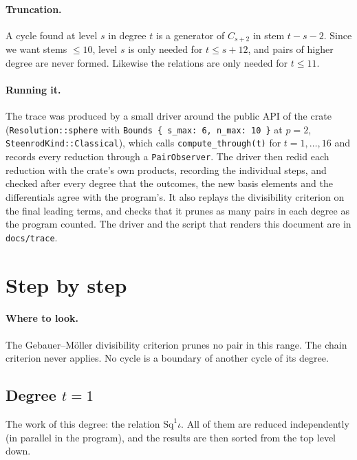 \documentclass[11pt]{article}
\newcommand{\Sq}{\mathrm{Sq}}
\begin{document}
\paragraph{Truncation.}
A cycle found at level $s$ in degree $t$ is a generator of $C_{s+2}$ in stem $t-s-2$. Since we
want stems $\le 10$, level $s$ is only needed for $t \le s + 12$, and pairs of higher degree are
never formed. Likewise the relations are only needed for $t \le 11$.

\paragraph{Running it.}\sloppy
The trace was produced by a small driver around the public API of the crate (\texttt{Resolution::sphere} with \texttt{Bounds \{ s\_max: 6, n\_max: 10 \}} at $p = 2$, \texttt{SteenrodKind::Classical}), which calls \texttt{compute\_through(t)} for $t = 1, \dots, 16$ and records every reduction through a \texttt{PairObserver}. The driver then redid each reduction with the crate's own products, recording the individual steps, and checked after every degree that the outcomes, the new basis elements and the differentials agree with the program's. It also replays the divisibility criterion on the final leading terms, and checks that it prunes as many pairs in each degree as the program counted. The driver and the script that renders this document are in \texttt{docs/trace}.

\section{Step by step}

\paragraph{Where to look.} The Gebauer--M\"oller divisibility criterion prunes no pair in this range. The chain criterion never applies. No cycle is a boundary of another cycle of its degree.

\subsection*{Degree $t = 1$}
\noindent The work of this degree: the relation $\Sq^{1}\iota$. All of them are reduced independently (in parallel in the program), and the results are then sorted from the top level down.
\medskip
\end{document}
